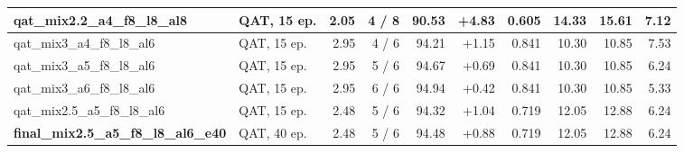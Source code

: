 \begin{tabular}{llrrrrrrrr}
qat\_mix2.2\_a4\_f8\_l8\_al8 & QAT, 15 ep. & 2.05 & 4 / 8 & 90.53 & +4.83 & 0.605 & 14.33 & 15.61 & 7.12 \\
\midrule
qat\_mix3\_a4\_f8\_l8\_al6 & QAT, 15 ep. & 2.95 & 4 / 6 & 94.21 & +1.15 & 0.841 & 10.30 & 10.85 & 7.53 \\
qat\_mix3\_a5\_f8\_l8\_al6 & QAT, 15 ep. & 2.95 & 5 / 6 & 94.67 & +0.69 & 0.841 & 10.30 & 10.85 & 6.24 \\
qat\_mix3\_a6\_f8\_l8\_al6 & QAT, 15 ep. & 2.95 & 6 / 6 & 94.94 & +0.42 & 0.841 & 10.30 & 10.85 & 5.33 \\
qat\_mix2.5\_a5\_f8\_l8\_al6 & QAT, 15 ep. & 2.48 & 5 / 6 & 94.32 & +1.04 & 0.719 & 12.05 & 12.88 & 6.24 \\
\midrule
\textbf{final\_mix2.5\_a5\_f8\_l8\_al6\_e40} & QAT, 40 ep. & 2.48 & 5 / 6 & 94.48 & +0.88 & 0.719 & 12.05 & 12.88 & 6.24 \\
\bottomrule
\end{tabular}
